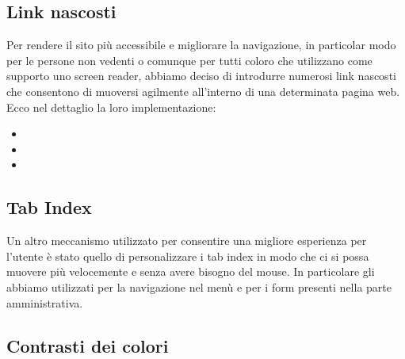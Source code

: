 \subsection{Link nascosti}
Per rendere il sito più accessibile e migliorare la navigazione, in particolar modo per le persone non vedenti o comunque per tutti coloro che utilizzano come supporto uno screen reader, abbiamo deciso di introdurre numerosi link nascosti che consentono di muoversi agilmente all'interno di una determinata pagina web. \\
Ecco nel dettaglio la loro implementazione:
	\begin{itemize}
		\item
		\item
		\item
	\end{itemize}
\subsection{Tab Index}
Un altro meccanismo utilizzato per consentire una migliore esperienza per l'utente è stato quello di personalizzare i tab index in modo che ci si possa muovere più velocemente e senza avere bisogno del mouse.
In particolare gli abbiamo utilizzati per la navigazione nel menù e per i form presenti nella parte amministrativa.

\subsection{Contrasti dei colori}